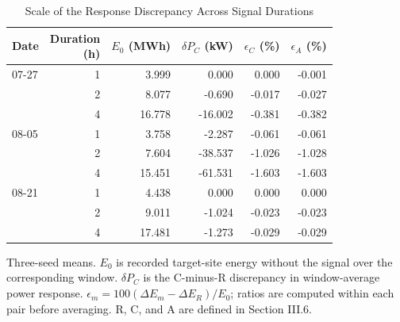 \begin{table}[H]
\color{black}
\caption{Scale of the Response Discrepancy Across Signal Durations}
\label{tab:app-response-scale}
\centering\footnotesize
\setlength{\tabcolsep}{2pt}
\renewcommand{\arraystretch}{1.12}
\begin{tabular*}{\columnwidth}{@{\extracolsep{\fill}}lrrrrr@{}}
\toprule
Date & \shortstack{Duration\\(h)} & \shortstack{$E_0$\\(MWh)} & \shortstack{$\delta P_C$\\(kW)} & \shortstack{$\epsilon_C$\\(\%)} & \shortstack{$\epsilon_A$\\(\%)}\\
\midrule
07-27 & 1 & 3.999 & 0.000 & 0.000 & -0.001\\
 & 2 & 8.077 & -0.690 & -0.017 & -0.027\\
 & 4 & 16.778 & -16.002 & -0.381 & -0.382\\
\midrule
08-05 & 1 & 3.758 & -2.287 & -0.061 & -0.061\\
 & 2 & 7.604 & -38.537 & -1.026 & -1.028\\
 & 4 & 15.451 & -61.531 & -1.603 & -1.603\\
\midrule
08-21 & 1 & 4.438 & 0.000 & 0.000 & 0.000\\
 & 2 & 9.011 & -1.024 & -0.023 & -0.023\\
 & 4 & 17.481 & -1.273 & -0.029 & -0.029\\
\bottomrule
\end{tabular*}
\vspace{3pt}
\parbox{\columnwidth}{Three-seed means. $E_0$ is recorded target-site energy without the signal over the corresponding window. $\delta P_C$ is the C-minus-R discrepancy in window-average power response. $\epsilon_m=100(\Delta E_m-\Delta E_R)/E_0$; ratios are computed within each pair before averaging. R, C, and A are defined in Section III.6.}
\end{table}
